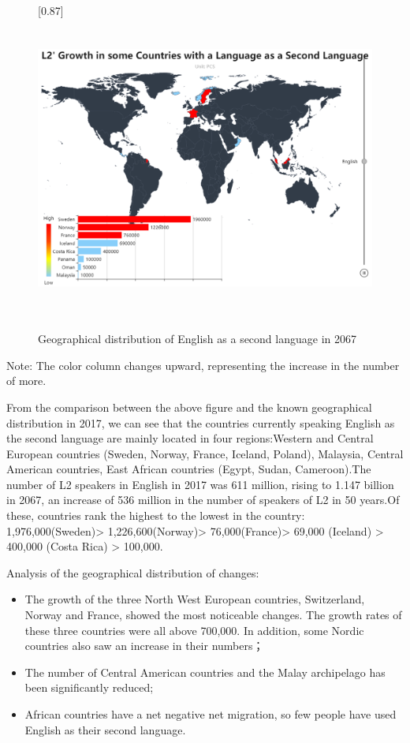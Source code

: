 \begin{figure}[H]
	\centering
	 \scalebox{0.87}[0.87]{%
	\includegraphics[width=1\linewidth,height=10cm]{figures/english}
     }
	\caption{Geographical distribution of English as a second language in 2067}
	\label{fig:english}
\end{figure}

\noindent Note: The color column changes upward, representing the increase in the number of more.

 From the comparison between the above figure and the known geographical distribution in 2017, we can see that the countries currently speaking English as the second language are mainly located in four regions:Western and Central European countries (Sweden, Norway, France, Iceland, Poland), Malaysia, Central American countries, East African countries (Egypt, Sudan, Cameroon).The number of L2 speakers in English in 2017 was 611 million, rising to 1.147 billion in 2067, an increase of 536 million in the number of speakers of L2 in 50 years.Of these, countries rank the highest to the lowest in the country: 1,976,000(Sweden)> 1,226,600(Norway)> 76,000(France)> 69,000 (Iceland) > 400,000 (Costa Rica) > 100,000.
\par Analysis of the geographical distribution of changes:
\begin{itemize}
	\item The growth of the three North West European countries, Switzerland, Norway and France, showed the most noticeable changes. The growth rates of these three countries were all above 700,000. In addition, some Nordic countries also saw an increase in their numbers；
	\item The number of Central American countries and the Malay archipelago has been significantly reduced;
	\item African countries have a net negative net migration, so few people have used English as their second language. 
\end{itemize} 

